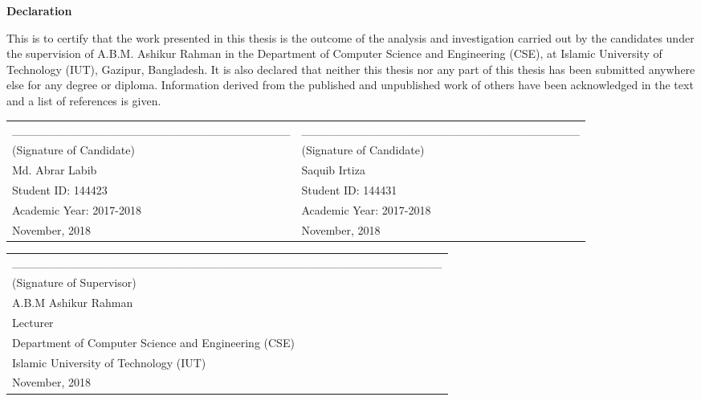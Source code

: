 \documentclass[12pt]{report}
\begin{document}
\newpage
\begin{titlepage}
\begin{center}
		\Large
		\textbf{Declaration}\\
\end{center}

\noindent This is to certify that the work presented in this thesis is the outcome of the analysis and investigation carried out by the candidates under the supervision of A.B.M. Ashikur Rahman in the Department of Computer Science and Engineering (CSE), at Islamic University of Technology (IUT), Gazipur, Bangladesh. It is also declared that neither this thesis nor any part of this thesis has been submitted anywhere else for any degree or diploma. Information derived from the published and unpublished work of others have been acknowledged in the text and a list of references is given.

\vspace{3.5cm}

\begin{table}[H]
\begin{center}
\begin{tabular}{C{7cm}C{8cm}}
\_\_\_\_\_\_\_\_\_\_\_\_\_\_\_\_\_\_\_\_\_\_\_\_\_\_\_\_\_\_\_\_\_&\_\_\_\_\_\_\_\_\_\_\_\_\_\_\_\_\_\_\_\_\_\_\_\_\_\_\_\_\_\_\_\_\_\\
\centering
(Signature of Candidate) & (Signature of Candidate)\\   
\centering
Md. Abrar Labib & Saquib Irtiza\\
\centering
Student ID: 144423 & Student ID: 144431\\
\centering
Academic Year: 2017-2018 & Academic Year: 2017-2018\\
\centering
November, 2018 & November, 2018\\
\end{tabular}
\end{center}
\end{table}

\vspace{3.0cm}


\begin{table}[H]
\begin{center}
\begin{tabular}{p{12cm}}
\centering 
\_\_\_\_\_\_\_\_\_\_\_\_\_\_\_\_\_\_\_\_\_\_\_\_\_\_\_\_\_\_\_\_\_\_\_\_\_\_\_\_\_\_\_\_\_\_\_\_\_\_\_\\
\centering 
(Signature of Supervisor)\\ 
\centering   
A.B.M Ashikur Rahman\\
\centering 
Lecturer\\
\centering 
Department of Computer Science and Engineering (CSE)\\
\centering 
Islamic University of Technology (IUT)\\
\centering 
November, 2018\\
\end{tabular}
\end{center}
\end{table}
\end{titlepage}
\end{document}

